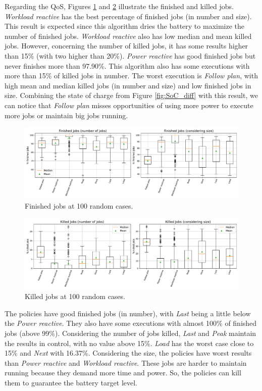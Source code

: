 Regarding the QoS, Figures \ref{fig:finished_diff} and \ref{fig:killed_diff} illustrate the finished and killed jobs. \emph{Workload reactive} has the best percentage of finished jobs (in number and size). This result is expected since this algorithm dries the battery to maximize the number of finished jobs. \emph{Workload reactive} also has low median and mean killed jobs. However, concerning the number of killed jobs, it has some results higher than 15\% (with two higher than 20\%). \emph{Power reactive} has good finished jobs but never finishes more than 97.90\%. This algorithm also has some executions with more than 15\% of killed jobs in number. The worst execution is \emph{Follow plan}, with high mean and median killed jobs (in number and size) and low finished jobs in size. Combining the state of charge from Figure \ref{fig:SoC_diff} with this result, we can notice that \emph{Follow plan} misses opportunities of using more power to execute more jobs or maintain big jobs running.

\begin{figure}[!htb]
    \centering
    \includegraphics[scale=0.38]{Images/Compensations/finished_diff.pdf}
    \caption{Finished jobs at 100 random cases.}
    \label{fig:finished_diff}
\end{figure}

\begin{figure}[!htb]
    \centering
    \includegraphics[scale=0.38]{Images/Compensations/killed_diff.pdf}
    \caption{Killed jobs at 100 random cases.}
    \label{fig:killed_diff}
\end{figure}

The policies have good finished jobs (in number), with \emph{Last} being a little below the \emph{Power reactive}. They also have some executions with almost 100\% of finished jobs (above 99\%). Considering the number of jobs killed, \emph{Last} and \emph{Peak} maintain the results in control, with no value above 15\%. \emph{Load} has the worst case close to 15\% and \emph{Next} with 16.37\%. Considering the size, the policies have worst results than \emph{Power reactive} and \emph{Workload reactive}. These jobs are harder to maintain running because they demand more time and power. So, the policies can kill them to guarantee the battery target level.

